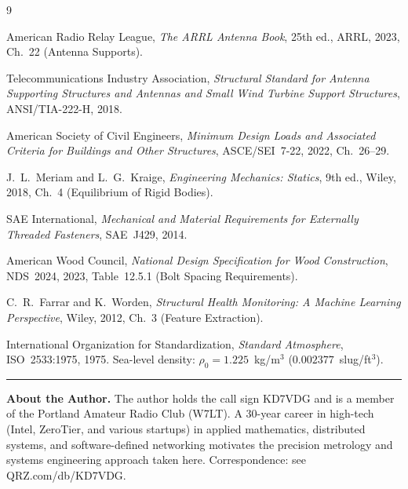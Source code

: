 \documentclass[11pt,twocolumn]{article}
\begin{document}
\begin{thebibliography}{9}

American Radio Relay League,
\textit{The ARRL Antenna Book}, 25th ed.,
ARRL, 2023, Ch.~22 (Antenna Supports).

Telecommunications Industry Association,
\textit{Structural Standard for Antenna Supporting Structures and Antennas
and Small Wind Turbine Support Structures}, ANSI/TIA-222-H, 2018.

American Society of Civil Engineers,
\textit{Minimum Design Loads and Associated Criteria for Buildings and Other
Structures}, ASCE/SEI~7-22, 2022, Ch.~26--29.

J.~L.\ Meriam and L.~G.\ Kraige,
\textit{Engineering Mechanics: Statics}, 9th ed.,
Wiley, 2018, Ch.~4 (Equilibrium of Rigid Bodies).

SAE International, \textit{Mechanical and Material Requirements for
Externally Threaded Fasteners}, SAE~J429, 2014.

American Wood Council,
\textit{National Design Specification for Wood Construction}, NDS~2024, 2023,
Table~12.5.1 (Bolt Spacing Requirements).

C.~R.\ Farrar and K.~Worden,
\textit{Structural Health Monitoring: A Machine Learning Perspective},
Wiley, 2012, Ch.~3 (Feature Extraction).

International Organization for Standardization,
\textit{Standard Atmosphere}, ISO~2533:1975, 1975.
Sea-level density: $\rho_0 = 1.225$~kg/m$^3$ ($0.002377$~slug/ft$^3$).

\end{thebibliography}

\vspace{10pt}
\hrule
\vspace{6pt}
{\small
\noindent\textbf{About the Author.}
The author holds the call sign KD7VDG and is a member of the Portland Amateur
Radio Club (W7LT). A 30-year career in high-tech (Intel, ZeroTier, and various
startups) in applied mathematics, distributed systems, and software-defined
networking motivates the precision metrology and systems engineering approach
taken here. Correspondence: see QRZ.com/db/KD7VDG.
}
\end{document}
